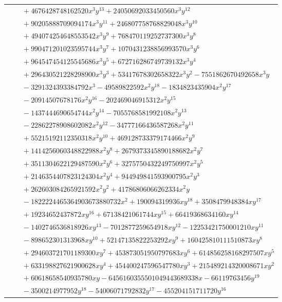 \documentclass[11pt]{article}
\begin{document}
\begin{longtable}{@{}ll@{}}
 & $\quad +4676428748162520x^{3}y^{13}+24050692033450560x^{3}y^{12}$\\
 & $\quad +90205888709094174x^{3}y^{11}+246807758768829048x^{3}y^{10}$\\
 & $\quad +494074254648553542x^{3}y^{9}+768470119252737300x^{3}y^{8}$\\
 & $\quad +990471201023595744x^{3}y^{7}+1070431238856993570x^{3}y^{6}$\\
 & $\quad +964547454125545686x^{3}y^{5}+672716286749739132x^{3}y^{4}$\\
 & $\quad +296430521228298900x^{3}y^{3}+53417678302658322x^{3}y^{2}-7551862670492658x^{3}y$\\
 & $\quad -3291324393384792x^{3}-49589822592x^{2}y^{18}-1834823435904x^{2}y^{17}$\\
 & $\quad -20914507678176x^{2}y^{16}-202469046915312x^{2}y^{15}$\\
 & $\quad -1437444690654744x^{2}y^{14}-7055768581992108x^{2}y^{13}$\\
 & $\quad -22862278908602082x^{2}y^{12}-34777166436587268x^{2}y^{11}$\\
 & $\quad +55215192112350318x^{2}y^{10}+469128733379174466x^{2}y^{9}$\\
 & $\quad +1414256060348822988x^{2}y^{8}+2679373345890188682x^{2}y^{7}$\\
 & $\quad +3511304622129487590x^{2}y^{6}+3275750432249750997x^{2}y^{5}$\\
 & $\quad +2146354407823124304x^{2}y^{4}+944949841593900795x^{2}y^{3}$\\
 & $\quad +262603084265921592x^{2}y^{2}+41786806066262334x^{2}y$\\
 & $\quad -1822224465364903673880732x^{2}+190094319936xy^{18}+3508479948384xy^{17}$\\
 & $\quad +19234652437872xy^{16}+67138421061744xy^{15}+66419368634160xy^{14}$\\
 & $\quad -1402746536818926xy^{13}-7012877259654918xy^{12}-12253421750001210xy^{11}$\\
 & $\quad -898652301313968xy^{10}+52147135822253292xy^{9}+160425810111510873xy^{8}$\\
 & $\quad +294603721701189300xy^{7}+453873051950797683xy^{6}+614856258168297507xy^{5}$\\
 & $\quad +633198827621900628xy^{4}+454400247596547780xy^{3}+215489214320008671xy^{2}$\\
 & $\quad +60618658540935780xy-6456160355501049443689338x-66119763456y^{19}$\\
 & $\quad -3500214977952y^{18}-54006071792832y^{17}-455204151711720y^{16}$\\

\end{longtable}
\end{document}
